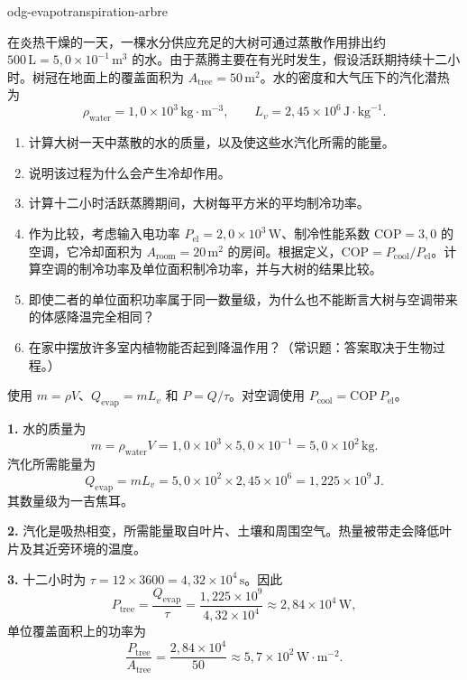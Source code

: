 \begin{exo}{odg-evapotranspiration-arbre}

在炎热干燥的一天，一棵水分供应充足的大树可通过蒸散作用排出约 $500\,\text{L}=5{,}0\times10^{-1}\,\text{m}^3$ 的水。由于蒸腾主要在有光时发生，假设活跃期持续十二小时。树冠在地面上的覆盖面积为 $A_{\text{tree}}=50\,\text{m}^2$。水的密度和大气压下的汽化潜热为
\[
\rho_{\text{water}}=1{,}0\times10^3\,\text{kg}\!\cdot\!\text{m}^{-3},
\qquad L_v=2{,}45\times10^6\,\text{J}\!\cdot\!\text{kg}^{-1}.
\]

\begin{enumerate}
  \item 计算大树一天中蒸散的水的质量，以及使这些水汽化所需的能量。
  \item 说明该过程为什么会产生冷却作用。
  \item 计算十二小时活跃蒸腾期间，大树每平方米的平均制冷功率。
  \item 作为比较，考虑输入电功率 $P_{\mathrm{el}}=2{,}0\times10^3\,\text{W}$、制冷性能系数 $\mathrm{COP}=3{,}0$ 的空调，它冷却面积为 $A_{\text{room}}=20\,\text{m}^2$ 的房间。根据定义，$\mathrm{COP}=P_{\text{cool}}/P_{\mathrm{el}}$。计算空调的制冷功率及单位面积制冷功率，并与大树的结果比较。
  \item 即使二者的单位面积功率属于同一数量级，为什么也不能断言大树与空调带来的体感降温完全相同？
  \item 在家中摆放许多室内植物能否起到降温作用？（常识题：答案取决于生物过程。）
\end{enumerate}

\begin{indication}
使用 $m=\rho V$、$Q_{\mathrm{evap}}=mL_v$ 和 $P=Q/\tau$。对空调使用 $P_{\text{cool}}=\mathrm{COP}\,P_{\mathrm{el}}$。
\end{indication}

\begin{solution}
\textbf{1.} 水的质量为
\[
m=\rho_{\text{water}}V=1{,}0\times10^3\times5{,}0\times10^{-1}
=5{,}0\times10^2\,\text{kg}.
\]
汽化所需能量为
\[
Q_{\mathrm{evap}}=mL_v=5{,}0\times10^2\times2{,}45\times10^6
=1{,}225\times10^9\,\text{J}.
\]
其数量级为一吉焦耳。

\textbf{2.} 汽化是吸热相变，所需能量取自叶片、土壤和周围空气。热量被带走会降低叶片及其近旁环境的温度。

\textbf{3.} 十二小时为 $\tau=12\times3600=4{,}32\times10^4\,\text{s}$。因此
\[
P_{\text{tree}}=\frac{Q_{\mathrm{evap}}}{\tau}
=\frac{1{,}225\times10^9}{4{,}32\times10^4}
\approx2{,}84\times10^4\,\text{W},
\]
单位覆盖面积上的功率为
\[
\frac{P_{\text{tree}}}{A_{\text{tree}}}
=\frac{2{,}84\times10^4}{50}
\approx5{,}7\times10^2\,\text{W}\!\cdot\!\text{m}^{-2}.
\]


\end{solution}
\end{exo}
